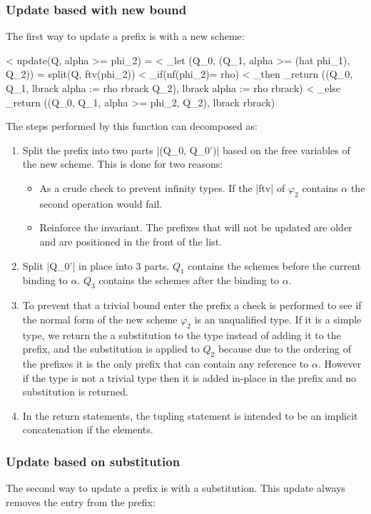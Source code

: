 \subsubsection{Update based with new bound}
The first way to update a prefix is with a new scheme:


< update(Q, alpha >= phi_2) =
<    _let (Q_0, (Q_1, alpha >= (hat phi_1), Q_2)) = split(Q, ftv(phi_2))
<               _if(nf(phi_2)= rho)
<                   _then  _return ((Q_0, Q_1, lbrack alpha := rho rbrack Q_2), lbrack alpha := rho rbrack)
<                   _else  _return ((Q_0, Q_1, alpha >= phi_2, Q_2), lbrack rbrack)

The steps performed by this function can decomposed as:

\begin{enumerate}
\item{ Split the prefix into two parts |(Q_0, Q_0')| based on the free variables of the new scheme. This is done for two reasons:  
		\begin{itemize}
		\item As a crude check to prevent infinity types. If the |ftv| of $\varphi_2$ contains $\alpha$ the second operation would fail.
		\item Reinforce the invariant. The prefixes that will not be updated are older and are positioned in the front of the list.
		\end{itemize}
     }
\item Split |Q_0'| in place into 3 parts. $Q_1$ contains the schemes before the current binding to $\alpha$. $Q_3$ contains the schemes after the binding to $\alpha$.
\item{ To prevent that a trivial bound enter the prefix a check is performed to see if the normal form of the new scheme $\varphi_2$ is an unqualified type. If it is a simple type, we return the a substitution to the type instead of adding it to the prefix, and the substitution is applied to $Q_2$ because due to the ordering of the prefixes it is the only prefix that can contain any reference to $\alpha$.
However if the type is not a trivial type then it is added in-place in the prefix and no substitution is returned.
     }
\item In the return statements, the tupling statement is intended to be an implicit concatenation if the elements. 
\end{enumerate}
\subsubsection{Update based on substitution}
The second way to update a prefix is with a substitution. This update always removes the entry from the prefix:

